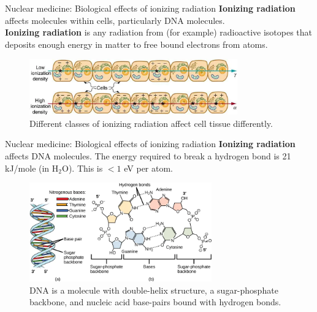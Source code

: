 \documentclass{beamer}
\begin{document}
\begin{frame}{Nuclear medicine: Biological effects of ionizing radiation}
\alert{\textbf{Ionizing radiation}} affects molecules within cells, particularly DNA molecules. \\ \vspace{0.25cm}
\small
\textbf{Ionizing radiation} is any radiation from (for example) radioactive isotopes that deposits enough energy in matter to free bound electrons from atoms.
\begin{figure}
\centering
\includegraphics[width=0.8\textwidth]{figures/cell.png}
\caption{\label{fig:cell_1} Different classes of ionizing radiation affect cell tissue differently.}
\end{figure}
\end{frame}

\begin{frame}{Nuclear medicine: Biological effects of ionizing radiation}
\small
\alert{\textbf{Ionizing radiation}} affects DNA molecules.  The energy required to break a hydrogen bond is 21 kJ/mole (in H$_2$O). This is $<1$ eV per atom.
\begin{figure}
\centering
\includegraphics[width=0.7\textwidth]{figures/dna.png}
\caption{\label{fig:cell_2} DNA is a molecule with double-helix structure, a sugar-phosphate backbone, and nucleic acid base-pairs bound with hydrogen bonds.}
\end{figure}
\end{frame}
\end{document}
